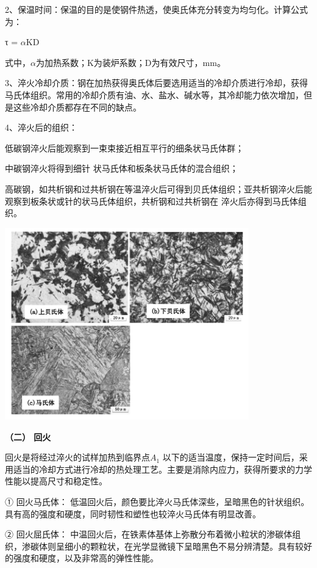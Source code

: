 \documentclass[a4paper,utf8]{article}
\begin{document}
2、保温时间：保温的目的是使钢件热透，使奥氏体充分转变为均匀化。计算公式为：
\begin{center}
    τ = $\alpha$KD
\end{center}
 
式中，$\alpha$为加热系数；K为装炉系数；D为有效尺寸，mm。

3、淬火冷却介质：钢在加热获得奥氏体后要选用适当的冷却介质进行冷却，获得马氏体组织。常用的冷却介质有油、水、盐水、碱水等，其冷却能力依次增加，但是这些冷却介质都存在不同的缺点。

4、淬火后的组织：

低碳钢淬火后能观察到一束束接近相互平行的细条状马氏体群；

中碳钢淬火将得到细针
状马氏体和板条状马氏体的混合组织；

高碳钢，如共析钢和过共析钢在等温淬火后可得到贝氏体组织；亚共析钢淬火后能观察到板条状或针的状马氏体组织，共析钢和过共析钢在
淬火后亦得到马氏体组织。

\begin{center}
    \includegraphics[width=300pt]{6.png}
\end{center}

\textbf{（二） 回火}

回火是将经过淬火的试样加热到临界点$A_1$ 以下的适当温度，保持一定时间后，采用适当的冷却方式进行冷却的热处理工艺。主要是消除内应力，获得所要求的力学性能以提高尺寸和稳定性。

① 回火马氏体：
低温回火后，颜色要比淬火马氏体深些，呈暗黑色的针状组织。 具有高的强度和硬度，同时韧性和塑性也较淬火马氏体有明显改善。

② 回火屈氏体：
中温回火后，在铁素体基体上弥散分布着微小粒状的渗碳体组织，渗碳体则呈细小的颗粒状，在光学显微镜下呈暗黑色不易分辨清楚。具有较好的强度和硬度，以及非常高的弹性性能。
\end{document}
